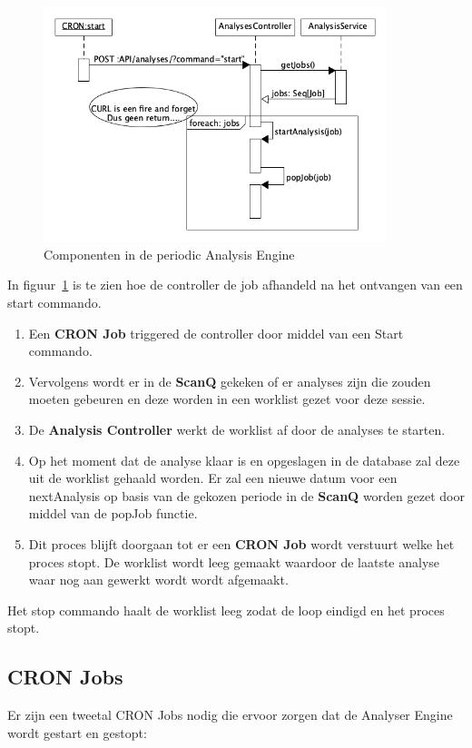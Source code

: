 \begin{figure}[bth]
    \myfloatalign
    \includegraphics[width=10cm]{gfx/umlet/exports/PAE-jobssequence}
    \caption{Componenten in de periodic Analysis Engine}
    \label{fig:jobSeq}
\end{figure}

In figuur~\ref{fig:jobSeq} is te zien hoe de controller de job afhandeld na het ontvangen van een start commando.
\begin{enumerate}
    \item Een \textbf{CRON Job} triggered de controller door middel van een Start commando.
    \item Vervolgens wordt er in de \textbf{ScanQ} gekeken of er analyses zijn die zouden moeten gebeuren en deze worden in een worklist gezet voor deze sessie.
    \item De \textbf{Analysis Controller} werkt de worklist af door de analyses te starten.
    \item Op het moment dat de analyse klaar is en opgeslagen in de database zal deze uit de worklist gehaald worden. Er zal een nieuwe datum voor een nextAnalysis op basis van de gekozen periode in de \textbf{ScanQ} worden gezet door middel van de popJob functie.
    \item Dit proces blijft doorgaan tot er een \textbf{CRON Job} wordt verstuurt welke het proces stopt. De worklist wordt leeg gemaakt waardoor de laatste analyse waar nog aan gewerkt wordt wordt afgemaakt.
\end{enumerate}

Het stop commando haalt de worklist leeg zodat de loop eindigd en het proces stopt.

\subsection{CRON Jobs}\label{subsec:cron-jobs}
Er zijn een tweetal CRON Jobs nodig die ervoor zorgen dat de Analyser Engine wordt gestart en gestopt:

